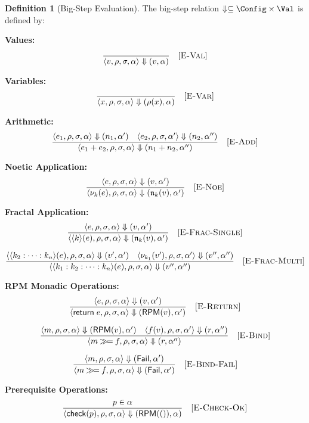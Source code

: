 \documentclass[11pt,twoside,openright]{book}
\theoremstyle{definition}
\newtheorem{definition}{Definition}[chapter]
\theoremstyle{plain}
\theoremstyle{remark}
\newcommand{\noe}[1]{\nu_{#1}}
\newcommand{\rpmret}{\mathsf{return}}
\newcommand{\rpmbind}{\mathbin{\gg\!=}}
\newcommand{\bigstep}{\Downarrow}
\newcommand{\Failed}{\mathsf{Fail}}
\begin{document}
\begin{definition}[Big-Step Evaluation]
\label{def:big-step}
The big-step relation $\bigstep \subseteq \Config \times \Val$ is defined by:

\textbf{Values:}
\[
\frac{}{\langle v, \rho, \sigma, \alpha \rangle \bigstep (v, \alpha)} \quad [\textsc{E-Val}]
\]

\textbf{Variables:}
\[
\frac{}{\langle x, \rho, \sigma, \alpha \rangle \bigstep (\rho(x), \alpha)} \quad [\textsc{E-Var}]
\]

\textbf{Arithmetic:}
\[
\frac{\langle e_1, \rho, \sigma, \alpha \rangle \bigstep (n_1, \alpha') \quad \langle e_2, \rho, \sigma, \alpha' \rangle \bigstep (n_2, \alpha'')}{\langle e_1 + e_2, \rho, \sigma, \alpha \rangle \bigstep (n_1 + n_2, \alpha'')} \quad [\textsc{E-Add}]
\]

\textbf{Noetic Application:}
\[
\frac{\langle e, \rho, \sigma, \alpha \rangle \bigstep (v, \alpha')}{\langle \noe{k}(e), \rho, \sigma, \alpha \rangle \bigstep (\mathfrak{n}_k(v), \alpha')} \quad [\textsc{E-Noe}]
\]

\textbf{Fractal Application:}
\[
\frac{\langle e, \rho, \sigma, \alpha \rangle \bigstep (v, \alpha')}{\langle \langle k \rangle(e), \rho, \sigma, \alpha \rangle \bigstep (\mathfrak{n}_k(v), \alpha')} \quad [\textsc{E-Frac-Single}]
\]

\[
\frac{\langle \langle k_2 : \cdots : k_n \rangle(e), \rho, \sigma, \alpha \rangle \bigstep (v', \alpha') \quad \langle \noe{k_1}(v'), \rho, \sigma, \alpha' \rangle \bigstep (v'', \alpha'')}{\langle \langle k_1 : k_2 : \cdots : k_n \rangle(e), \rho, \sigma, \alpha \rangle \bigstep (v'', \alpha'')} \quad [\textsc{E-Frac-Multi}]
\]

\textbf{RPM Monadic Operations:}
\[
\frac{\langle e, \rho, \sigma, \alpha \rangle \bigstep (v, \alpha')}{\langle \rpmret\; e, \rho, \sigma, \alpha \rangle \bigstep (\mathsf{RPM}(v), \alpha')} \quad [\textsc{E-Return}]
\]

\[
\frac{\langle m, \rho, \sigma, \alpha \rangle \bigstep (\mathsf{RPM}(v), \alpha') \quad \langle f(v), \rho, \sigma, \alpha' \rangle \bigstep (r, \alpha'')}{\langle m \rpmbind f, \rho, \sigma, \alpha \rangle \bigstep (r, \alpha'')} \quad [\textsc{E-Bind}]
\]

\[
\frac{\langle m, \rho, \sigma, \alpha \rangle \bigstep (\Failed, \alpha')}{\langle m \rpmbind f, \rho, \sigma, \alpha \rangle \bigstep (\Failed, \alpha')} \quad [\textsc{E-Bind-Fail}]
\]

\textbf{Prerequisite Operations:}
\[
\frac{p \in \alpha}{\langle \mathsf{check}(p), \rho, \sigma, \alpha \rangle \bigstep (\mathsf{RPM}(()), \alpha)} \quad [\textsc{E-Check-Ok}]
\]


\end{definition}
\end{document}
